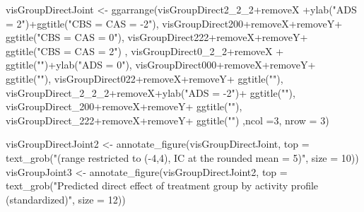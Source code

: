 \documentclass[
  10pt,
  dvipsnames,enabledeprecatedfontcommands]{scrartcl}
\newenvironment{Shaded}{\begin{snugshade}}{\end{snugshade}}
\newcommand{\AttributeTok}[1]{\textcolor[rgb]{0.77,0.63,0.00}{#1}}
\newcommand{\DecValTok}[1]{\textcolor[rgb]{0.00,0.00,0.81}{#1}}
\newcommand{\FunctionTok}[1]{\textcolor[rgb]{0.00,0.00,0.00}{#1}}
\newcommand{\NormalTok}[1]{#1}
\newcommand{\OtherTok}[1]{\textcolor[rgb]{0.56,0.35,0.01}{#1}}
\newcommand{\SpecialCharTok}[1]{\textcolor[rgb]{0.00,0.00,0.00}{#1}}
\newcommand{\StringTok}[1]{\textcolor[rgb]{0.31,0.60,0.02}{#1}}
\begin{document}
\begin{Shaded}
\begin{Highlighting}[]
\NormalTok{visGroupDirectJoint }\OtherTok{\textless{}{-}} \FunctionTok{ggarrange}\NormalTok{(visGroupDirect2\_2\_2}\SpecialCharTok{+}\NormalTok{removeX }\SpecialCharTok{+}\FunctionTok{ylab}\NormalTok{(}\StringTok{"ADS = 2"}\NormalTok{)}\SpecialCharTok{+}\FunctionTok{ggtitle}\NormalTok{(}\StringTok{"CBS = CAS = {-}2"}\NormalTok{),}
\NormalTok{                                 visGroupDirect200}\SpecialCharTok{+}\NormalTok{removeX}\SpecialCharTok{+}\NormalTok{removeY}\SpecialCharTok{+} \FunctionTok{ggtitle}\NormalTok{(}\StringTok{"CBS = CAS = 0"}\NormalTok{),}
\NormalTok{                                 visGroupDirect222}\SpecialCharTok{+}\NormalTok{removeX}\SpecialCharTok{+}\NormalTok{removeY}\SpecialCharTok{+} \FunctionTok{ggtitle}\NormalTok{(}\StringTok{"CBS = CAS = 2"}\NormalTok{) ,}
\NormalTok{                        visGroupDirect0\_2\_2}\SpecialCharTok{+}\NormalTok{removeX }\SpecialCharTok{+} \FunctionTok{ggtitle}\NormalTok{(}\StringTok{""}\NormalTok{)}\SpecialCharTok{+}\FunctionTok{ylab}\NormalTok{(}\StringTok{"ADS = 0"}\NormalTok{),}
\NormalTok{                                visGroupDirect000}\SpecialCharTok{+}\NormalTok{removeX}\SpecialCharTok{+}\NormalTok{removeY}\SpecialCharTok{+} \FunctionTok{ggtitle}\NormalTok{(}\StringTok{""}\NormalTok{),}
\NormalTok{                                visGroupDirect022}\SpecialCharTok{+}\NormalTok{removeX}\SpecialCharTok{+}\NormalTok{removeY}\SpecialCharTok{+} \FunctionTok{ggtitle}\NormalTok{(}\StringTok{""}\NormalTok{),}
\NormalTok{                        visGroupDirect\_2\_2\_2}\SpecialCharTok{+}\NormalTok{removeX}\SpecialCharTok{+}\FunctionTok{ylab}\NormalTok{(}\StringTok{"ADS = {-}2"}\NormalTok{)}\SpecialCharTok{+} \FunctionTok{ggtitle}\NormalTok{(}\StringTok{""}\NormalTok{),}
\NormalTok{                                  visGroupDirect\_200}\SpecialCharTok{+}\NormalTok{removeX}\SpecialCharTok{+}\NormalTok{removeY}\SpecialCharTok{+} \FunctionTok{ggtitle}\NormalTok{(}\StringTok{""}\NormalTok{),}
\NormalTok{                        visGroupDirect\_222}\SpecialCharTok{+}\NormalTok{removeX}\SpecialCharTok{+}\NormalTok{removeY}\SpecialCharTok{+} \FunctionTok{ggtitle}\NormalTok{(}\StringTok{""}\NormalTok{)}
\NormalTok{                                 ,}\AttributeTok{ncol =}\DecValTok{3}\NormalTok{, }\AttributeTok{nrow =} \DecValTok{3}\NormalTok{)}
                                  
      


\NormalTok{visGroupDirectJoint2 }\OtherTok{\textless{}{-}} \FunctionTok{annotate\_figure}\NormalTok{(visGroupDirectJoint, }
                                  \AttributeTok{top =} \FunctionTok{text\_grob}\NormalTok{(}\StringTok{"(range restricted to ({-}4,4), IC at the rounded mean = 5)"}\NormalTok{,}
                                                  \AttributeTok{size =} \DecValTok{10}\NormalTok{))}
\NormalTok{visGroupJoint3 }\OtherTok{\textless{}{-}} \FunctionTok{annotate\_figure}\NormalTok{(visGroupDirectJoint2, }
                                  \AttributeTok{top =} \FunctionTok{text\_grob}\NormalTok{(}\StringTok{"Predicted direct effect of treatment group by activity profile (standardized)"}\NormalTok{,}
                                                  \AttributeTok{size =} \DecValTok{12}\NormalTok{))}


\end{Highlighting}
\end{Shaded}
\end{document}
